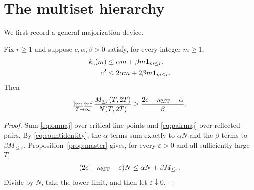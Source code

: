 \section{The multiset hierarchy}

We first record a general majorization device.

\begin{lemma}\label{lem:multmaj}
Fix $r\geq1$ and suppose $c,\alpha,\beta>0$ satisfy, for every integer $m\geq1$,
\begin{align}
k_c(m)&\leq \alpha m+\beta m\mathbf 1_{m\leq r},\label{eq:onmaj}\\
c^2&\leq 2\alpha m+2\beta m\mathbf 1_{m\leq r}.\label{eq:pairmaj}
\end{align}
Then
\begin{equation}\label{eq:multgeneric}
\liminf_{T\to\infty}\frac{M_{\leq r}(T,2T)}{N(T,2T)}
\geq \frac{2c-\kappa_{\mathrm{MT}}-\alpha}{\beta}.
\end{equation}
\end{lemma}

\begin{proof}
Sum \eqref{eq:onmaj} over critical-line points and \eqref{eq:pairmaj} over reflected pairs.  By \eqref{eq:countidentity}, the $\alpha$-terms sum exactly to $\alpha N$ and the $\beta$-terms to $\beta M_{\leq r}$.  Proposition~\ref{prop:master} gives, for every $\varepsilon>0$ and all sufficiently large $T$,
\[
(2c-\kappa_{\mathrm{MT}}-\varepsilon)N\leq \alpha N+\beta M_{\leq r}.
\]
Divide by $N$, take the lower limit, and then let $\varepsilon\downarrow0$.
\end{proof}

